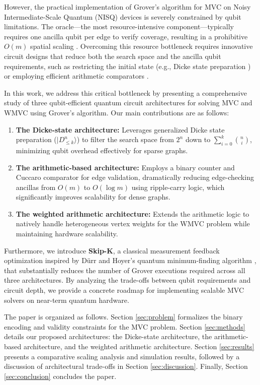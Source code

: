 \documentclass{ieeeaccess}
\begin{document}
However, the practical implementation of Grover's algorithm for MVC on Noisy Intermediate-Scale Quantum (NISQ) devices \cite{preskill_quantum_2018} is severely constrained by qubit limitations. The oracle---the most resource-intensive component---typically requires one ancilla qubit per edge to verify coverage, resulting in a prohibitive $O(m)$ spatial scaling \cite{cherif_simplified_2024,jiang_novel_2023}. Overcoming this resource bottleneck requires innovative circuit designs that reduce both the search space and the ancilla qubit requirements, such as restricting the initial state (e.g., Dicke state preparation \cite{jiang_dicke_2025,jiang_improving_2025}) or employing efficient arithmetic comparators \cite{benchasattabuse_quantum_2019}.

In this work, we address this critical bottleneck by presenting a comprehensive study of three qubit-efficient quantum circuit architectures for solving MVC and WMVC using Grover's algorithm. Our main contributions are as follows:
\begin{enumerate}
    \item \textbf{The Dicke-state architecture:} Leverages generalized Dicke state preparation ($|D_{\le k}^n\rangle$) to filter the search space from $2^n$ down to $\sum_{i=0}^{k}\binom{n}{i}$, minimizing qubit overhead effectively for sparse graphs.
    \item \textbf{The arithmetic-based architecture:} Employs a binary counter and Cuccaro comparator for edge validation, dramatically reducing edge-checking ancillas from $O(m)$ to $O(\log m)$ using ripple-carry logic, which significantly improves scalability for dense graphs.
    \item \textbf{The weighted arithmetic architecture:} Extends the arithmetic logic to natively handle heterogeneous vertex weights for the WMVC problem while maintaining hardware scalability.
\end{enumerate}
Furthermore, we introduce \textbf{Skip-K}, a classical measurement feedback optimization inspired by D\"{u}rr and Hoyer's quantum minimum-finding algorithm \cite{durr_quantum_1999}, that substantially reduces the number of Grover executions required across all three architectures. By analyzing the trade-offs between qubit requirements and circuit depth, we provide a concrete roadmap for implementing scalable MVC solvers on near-term quantum hardware.

The paper is organized as follows. Section \ref{sec:problem} formalizes the binary encoding and validity constraints for the MVC problem. Section \ref{sec:methods} details our proposed architectures: the Dicke-state architecture, the arithmetic-based architecture, and the weighted arithmetic architecture. Section \ref{sec:results} presents a comparative scaling analysis and simulation results, followed by a discussion of architectural trade-offs in Section \ref{sec:discussion}. Finally, Section \ref{sec:conclusion} concludes the paper.
\end{document}
